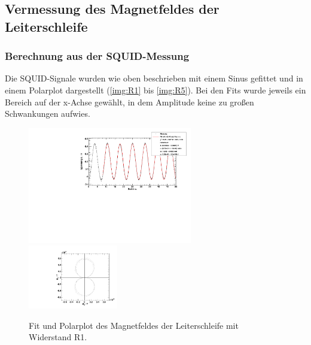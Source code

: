 \subsection{Vermessung des Magnetfeldes der Leiterschleife}
\subsubsection{Berechnung aus der SQUID-Messung}

Die SQUID-Signale wurden wie oben beschrieben mit einem Sinus gefittet und in einem Polarplot dargestellt 
(\autoref{img:R1} bis \autoref{img:R5}). Bei den Fits wurde jeweils ein Bereich auf der x-Achse gewählt, in dem Amplitude keine zu großen 
Schwankungen aufwies.

\begin{figure}[H]
\begin{center}
  \includegraphics[width=0.64\textwidth]{../img/fit_Spule_R1.pdf}
  \includegraphics[width=0.35\textwidth]{../img/polar_Spule_R1.pdf}
  \caption{Fit und Polarplot des Magnetfeldes der Leiterschleife mit Widerstand R1.}
  \label{img:R1}
\end{center}
\end{figure}

